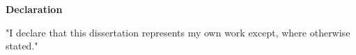 \thispagestyle{plain}
\begin{center}
  \textbf{Declaration}
\end{center}

"I declare that this dissertation represents my own work except, where otherwise stated."
